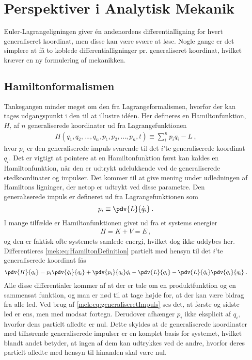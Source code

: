 \section{Perspektiver i Analytisk Mekanik}
Euler-Lagrangeligningen giver én andenordens differentialligning for hvert generaliseret koordinat, men disse kan være svære at løse. Nogle gange er det simplere at få to koblede differentialligninger pr. generaliseret koordinat, hvilket kræver en ny formulering af mekanikken.

\subsection{Hamiltonformalismen}
Tankegangen minder meget om den fra Lagrangeformalismen, hvorfor der kan tages udgangspunkt i den til at illustre idéen. Her defineres en Hamiltonfunktion, $H$, af $n$ generaliserede koordinater ud fra Lagrangefunktionen
%
\begin{align} \label{mek:eq:HamiltonDefinition}
	H(q_1,q_2,...,q_n,p_1,p_2,...,p_n,t) \equiv \sum_i^np_i\dot{q}_i - L \: ,
\end{align}
%
hvor $p_i$ er den generaliserede impuls svarende til det $i$'te generaliserede koordinat $q_i$. Det er vigtigt at pointere at en Hamiltonfunktion først kan kaldes en Hamiltonfunktion, når den er udtrykt udelukkende ved de generaliserede stedkoordinater og impulser. Det kommer til at give mening under udledningen af Hamiltons ligninger, der netop er udtrykt ved disse parametre. Den generaliserede impuls er defineret ud fra Lagrangefunktionen som
\begin{align} \label{mek:eq:generaliseretImpuls}
	p_i \equiv \pdv{L}{\dot{q}_i} \: .
\end{align}
I mange tilfælde er Hamiltonfunktionen givet ud fra et systems energier
\begin{align} \label{mek:eq:H=E}
	H = K + V = E \: ,
\end{align}
og den er faktisk ofte systemets samlede energi, hvilket dog ikke uddybes her. \\%
Differentieres \cref{mek:eq:HamiltonDefinition} partielt med hensyn til det $i$'te generaliserede koordinat fås
%
\begin{align}
	\pdv{H}{q_i} = p_i\pdv{\dot{q}_i}{q_i} + \pdv{p_i}{q_i}\dot{q_i} - \pdv{L}{q_i} - \pdv{L}{\dot{q}_i}\pdv{\dot{q}_i}{q_i} \: .
\end{align}
%
Alle disse differentialer kommer af at der er tale om en produktfunktion og en sammensat funktion, og man er nød til at tage højde for, at der kan være bidrag fra alle led. Ved brug af \cref{mek:eq:generaliseretImpuls} ses det, at første og sidste led er ens, men med modsat fortegn. Derudover afhænger $p_i$ ikke eksplicit af $q_i$, hvorfor dens partielt afledte er nul. Dette skyldes at de generaliserede koordinater med tilhørende generaliserede impulser er en komplet basis for systemet, hvilket blandt andet betyder, at ingen af dem kan udtrykkes ved de andre, hvorfor deres partielt afledte med hensyn til hinanden skal være nul. \\

